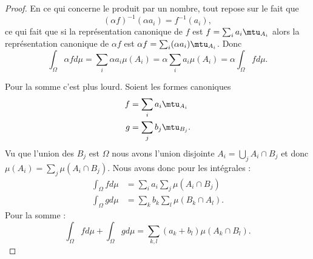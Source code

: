 \begin{proof}
	En ce qui concerne le produit par un nombre, tout repose sur le fait que
	\begin{equation}
		(\alpha f)^{-1}(\alpha a_i)=f^{-1}(a_i),
	\end{equation}
	ce qui fait que si la représentation canonique de \( f\) est \( f=\sum_ia_i\mtu_{A_i}\) alors la représentation canonique de \( \alpha f\) est \( \alpha f=\sum_i(\alpha a_i)\mtu_{A_i}\). Donc
	\begin{equation}
		\int_{\Omega}\alpha fd\mu=\sum_i\alpha a_i\mu(A_i)=\alpha \sum_ia_i\mu(A_i)=\alpha\int_{\Omega}fd\mu.
	\end{equation}

	Pour la somme c'est plus lourd. Soient les formes canoniques
	\begin{subequations}
		\begin{align}
			f & =\sum_ia_i\mtu_{A_i}  \\
			g & =\sum_jb_j\mtu_{B_j}.
		\end{align}
	\end{subequations}
	Vu que l'union des \( B_j\) est \( \Omega\) nous avons l'union disjointe \( A_i=\bigcup_jA_i\cap B_j\) et donc \( \mu(A_i)=\sum_j\mu(A_i\cap B_j)\). Nous avons donc pour les intégrales :
	\begin{subequations}
		\begin{align}
			\int_{\Omega}fd\mu & =\sum_ia_i\sum_j\mu(A_i\cap B_j)  \\
			\int_{\Omega}gd\mu & =\sum_kb_k\sum_l\mu(B_k\cap A_l).
		\end{align}
	\end{subequations}
	Pour la somme :
	\begin{equation}
		\int_{\Omega}fd\mu+\int_{\Omega}gd\mu=\sum_{k,l}(a_k+b_l)\mu(A_k\cap B_l).
	\end{equation}


\end{proof}
